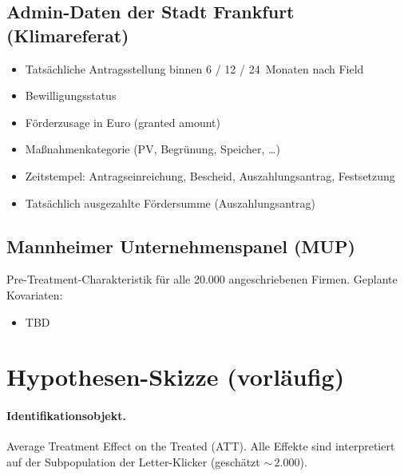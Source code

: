 \documentclass[11pt, a4paper]{scrartcl}
\begin{document}
\subsection{Admin-Daten der Stadt Frankfurt (Klimareferat)}

\begin{itemize}
    \item Tatsächliche Antragsstellung binnen 6 / 12 / 24~Monaten nach Field
    \item Bewilligungsstatus
    \item Förderzusage in Euro (granted amount)
    \item Maßnahmenkategorie (PV, Begrünung, Speicher, \ldots)
    \item Zeitstempel: Antragseinreichung, Bescheid, Auszahlungsantrag, Festsetzung
    \item Tatsächlich ausgezahlte Fördersumme (Auszahlungsantrag)
\end{itemize}

\subsection{Mannheimer Unternehmenspanel (MUP)}

Pre-Treatment-Charakteristik für alle 20.000 angeschriebenen Firmen.
Geplante Kovariaten:

\begin{itemize}
    \item TBD
\end{itemize}



\section{Hypothesen-Skizze (vorläufig)}

\paragraph{Identifikationsobjekt.} Average Treatment Effect on the Treated
(ATT). Alle Effekte sind interpretiert auf der Subpopulation der
Letter-Klicker (geschätzt ${\sim}\,2.000$).



\end{document}
